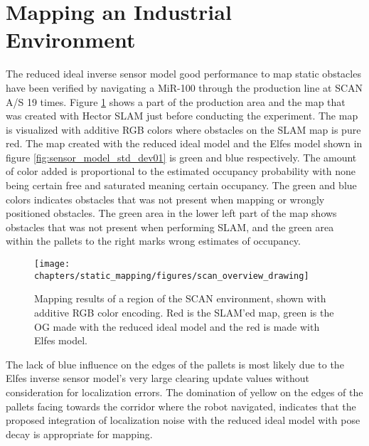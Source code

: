 \section{Mapping an Industrial Environment}
\label{sec:mapping_at_scan}
The reduced ideal inverse sensor model good performance to map static obstacles have been verified by navigating a MiR-100 through the production line at SCAN A/S 19 times.
Figure \ref{fig:scan_overview_drawing} shows a part of the production area and the map that was created with Hector SLAM \cite{hector_slam} just before conducting the experiment.
The map is visualized with additive RGB colors where obstacles on the SLAM map is pure red. 
The map created with the reduced ideal model and the Elfes model shown in figure \ref{fig:sensor_model_std_dev01} is green and blue respectively.
The amount of color added is proportional to the estimated occupancy probability with none being certain free and saturated meaning certain occupancy. 
The green and blue colors indicates obstacles that was not present when mapping or wrongly positioned obstacles.
The green area in the lower left part of the map shows obstacles that was not present when performing SLAM, and the green area within the pallets to the right marks wrong estimates of occupancy.

\begin{figure}
    \centering
    \texttt{[image: chapters/static\_mapping/figures/scan\_overview\_drawing]}
    \caption{Mapping results of a region of the SCAN environment, shown with additive RGB color encoding. Red is the SLAM'ed map, green is the OG made with the reduced ideal model and the red is made with Elfes model.}
    \label{fig:scan_overview_drawing}
\end{figure}

The lack of blue influence on the edges of the pallets is most likely due to the Elfes inverse sensor model's very large clearing update values without consideration for localization errors.
The domination of yellow on the edges of the pallets facing towards the corridor where the robot navigated, indicates that the proposed integration of localization noise with the reduced ideal model with pose decay is appropriate for mapping. 
